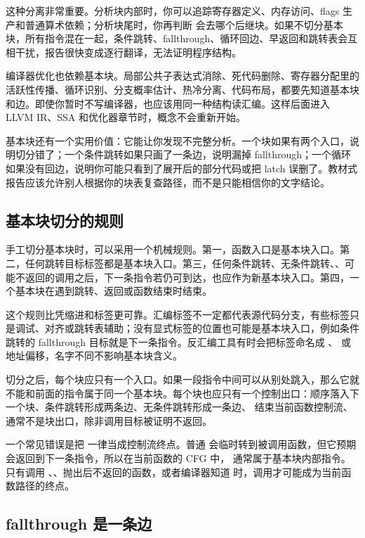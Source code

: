 这种分离非常重要。分析块内部时，你可以追踪寄存器定义、内存访问、flags 生产和普通算术依赖；分析块尾时，你再判断  会去哪个后继块。如果不切分基本块，所有指令混在一起，条件跳转、fallthrough、循环回边、早返回和跳转表会互相干扰，报告很快变成逐行翻译，无法证明程序结构。

编译器优化也依赖基本块。局部公共子表达式消除、死代码删除、寄存器分配里的活跃性传播、循环识别、分支概率估计、热冷分离、代码布局，都要先知道基本块和边。即使你暂时不写编译器，也应该用同一种结构读汇编。这样后面进入 LLVM IR、SSA 和优化器章节时，概念不会重新开始。

基本块还有一个实用价值：它能让你发现不完整分析。一个块如果有两个入口，说明切分错了；一个条件跳转如果只画了一条边，说明漏掉 fallthrough；一个循环如果没有回边，说明你可能只看到了展开后的部分代码或把 latch 误删了。教材式报告应该允许别人根据你的块表复查路径，而不是只能相信你的文字结论。

\subsection{基本块切分的规则}

手工切分基本块时，可以采用一个机械规则。第一，函数入口是基本块入口。第二，任何跳转目标标签都是基本块入口。第三，任何条件跳转、无条件跳转、、可能不返回的调用之后，下一条指令若仍可到达，也应作为新基本块入口。第四，一个基本块在遇到跳转、返回或函数结束时结束。

这个规则比凭缩进和标签更可靠。汇编标签不一定都代表源代码分支，有些标签只是调试、对齐或跳转表辅助；没有显式标签的位置也可能是基本块入口，例如条件跳转的 fallthrough 目标就是下一条指令。反汇编工具有时会把标签命名成 、 或地址偏移，名字不同不影响基本块含义。

切分之后，每个块应只有一个入口。如果一段指令中间可以从别处跳入，那么它就不能和前面的指令属于同一个基本块。每个块也应只有一个控制出口：顺序落入下一个块、条件跳转形成两条边、无条件跳转形成一条边、 结束当前函数控制流、 通常不是块出口，除非调用目标被证明不返回。

一个常见错误是把  一律当成控制流终点。普通  会临时转到被调用函数，但它预期会返回到下一条指令，所以在当前函数的 CFG 中， 通常属于基本块内部指令。只有调用 、、抛出后不返回的函数，或者编译器知道 \code{[[noreturn]]} 时，调用才可能成为当前函数路径的终点。

\subsection{fallthrough 是一条边}

